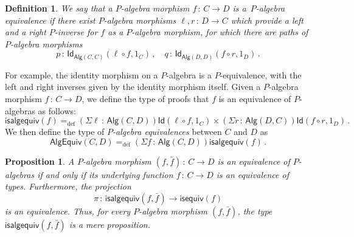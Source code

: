 \documentclass[10pt,a4paper,oneside,reqno]{amsart}
\numberwithin{equation}{section}
\theoremstyle{mythm}
\newtheorem{proposition}[theorem]{Proposition}
\theoremstyle{mydef}
\newtheorem{definition}[theorem]{Definition}
\theoremstyle{myrmk}
\newcommand{\ie}{\text{i.e.\ }}
\newcommand{\defeq}{=_{\mathrm{def}}}
\newcommand{\co}{\,{:}\,}
\newcommand{\Id}{\mathsf{Id}}
\newcommand{\Palg}{\mathsf{Alg}}
\newcommand{\isalgequiv}{\mathsf{isalgequiv}}
\newcommand{\AlgEquiv}{\mathsf{AlgEquiv}}
\begin{document}
\begin{definition} We say that a $P$-algebra morphism $f \co C \to D$ is 
 a~\emph{$P$-algebra equivalence}
if there exist $P$-algebra morphisms $\ell,r \co D \to C$  which provide a left and a right $P$-inverse for $f$ as a
$P$-algebra morphism, \ie for
which there are paths of $P$-algebra morphisms
\[ 
p \co \Id_{\Palg(C,C)}( \ell \circ f,  1_C) \, , \quad q \co \Id_{\Palg(D,D)}( f \circ r , 1_D) \, .
\]
\end{definition}

For example, the identity morphism on a $P$-algebra is a $P$-equivalence, with the left and right inverses given by the identity morphism itself.  Given a $P$-algebra morphism $f \co C \to D$, we define the type of proofs that $f$ is an equivalence of $P$-algebras as follows:
\[
\isalgequiv(f) \defeq  (\Sigma \ell \co  \Palg(C,D)) \Id( \ell \circ f, 1_C )  \times 
    (\Sigma r  \co \Palg(D, C)) \Id( f \circ r , 1_D ) \, .
\]
We then define the type of \emph{$P$-algebra equivalences} between $C$ and $D$ as
\[
\AlgEquiv(C, D)
\defeq   (\Sigma f \co \Palg(C,D)) \isalgequiv(f)  \, . 
\] 


\begin{proposition}\label{WAlgSpace} A $P$-algebra morphism $(f, \bar{f}) \co C \to D$ is an equivalence of
$P$-algebras if and only
if its underlying function $f \co C \to D$ is an equivalence of types. Furthermore, the projection
\[
\pi \co \isalgequiv(f, \bar{f})  \to \mathsf{isequiv}(f)  
\]
is an equivalence. Thus, for every $P$-algebra morphism $(f, \bar{f})$, the type $\isalgequiv(f, \bar{f})$ is
a mere proposition. 
\end{proposition}  
\end{document}
